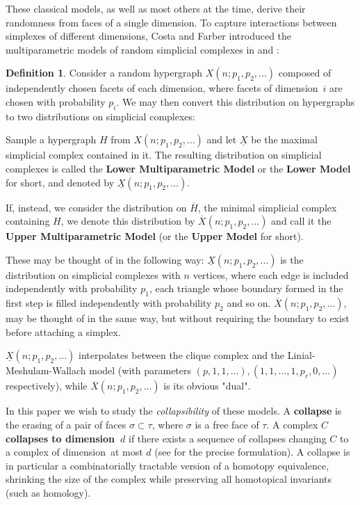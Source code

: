 \documentclass{article}
\theoremstyle{plain}
\theoremstyle{definition}
\newtheorem{definition}[theorem]{Definition}
\theoremstyle{remark}
\newcommand{\di}{dimension}
\begin{document}
These classical models, as well as most others at the time, derive their randomness from faces of a single dimension. To capture interactions between simplexes of different dimensions, Costa and Farber introduced the multiparametric models of random simplicial complexes in \cite{CostaFarber} and \cite{FarberMeadNowik19}:
\begin{definition}\label{defLMM}
Consider a random hypergraph $X(n;p_1,p_2,...)$ composed of independently chosen facets of each \di , where facets of \di \ $i$ are chosen with probability $p_i$.
We may then convert this distribution on hypergraphs to two distributions on simplicial complexes:

Sample a hypergraph $H$ from $X(n;p_1,p_2,...)$ and let $\underline{X}$ be the  maximal simplicial complex contained in it. 
The resulting distribution on simplicial complexes is called the \textbf{Lower Multiparametric Model} or the \textbf{Lower Model} for short, and denoted by $\underline{X}(n;p_1,p_2,...)$.

If, instead, we consider the distribution on $\overline{H}$, the minimal simplicial complex containing $H$, we denote this distribution by
$\overline{X}(n;p_1,p_2,...)$ and call it the \textbf{Upper Multiparametric Model} (or the \textbf{Upper Model} for short).
 \end{definition}
  These may be thought of in the following way:
  $\underline{X}(n;p_1,p_2,...)$ is the distribution on simplicial complexes with $n$ vertices, where each edge is included independently with probability $p_1$, each triangle whose boundary formed in the first step is filled independently with probability $p_2$ and so on.
  $\overline{X}(n;p_1,p_2,...)$, may be thought of in the same way, but without requiring the boundary to exist before attaching a simplex.

 $\underline{X}(n;p_1,p_2,...)$ interpolates between the clique complex and the Linial-Meshulam-Wallach model (with parameters $(p,1,1,...),(1,1,...,1,p_r,0,...)$ respectively), while $\overline{X}(n;p_1,p_2,...)$ is its obvious "dual".

In this paper we wish to study the \emph{collapsibility} of these models. A \textbf{collapse} is the erasing of a pair of faces $\sigma\subset\tau$, where $\sigma$ is a free face of $\tau$.
A complex $C$ \textbf{collapses to \di\ $d$} if there exists a sequence of collapses changing $C$ to a complex of \di\ at most $d$ (see  for the precise formulation).
A collapse is in particular a combinatorially tractable version of a homotopy equivalence, shrinking the size of the complex while preserving all homotopical invariants (such as homology).
\end{document}
